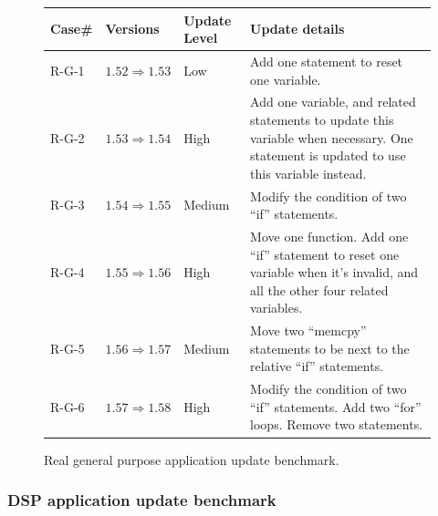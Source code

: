 \begin{figure}[htbp]
\begin{center}
\begin{small}
\begin{tabular}{||p{0.5in}|p{1in}|p{0.6in}|p{3.5in}||} \hline

Case\# & Versions & Update Level & Update details \\ \hline \hline

R-G-1 &  ${1.52 \Rightarrow 1.53}$ & Low & Add one statement to reset one variable. \\ \hline
R-G-2 &  ${1.53 \Rightarrow 1.54}$ & High & Add one variable, and related statements to
	update this variable when necessary. One statement is updated to use this variable instead. \\ \hline
R-G-3 &  ${1.54 \Rightarrow 1.55}$ & Medium & Modify the condition of two ``if'' statements. \\ \hline
R-G-4 &  ${1.55 \Rightarrow 1.56}$ & High & Move one function. Add one ``if'' statement to reset 
	one variable when it's invalid, and all the other four related variables. \\ \hline
R-G-5 &  ${1.56 \Rightarrow 1.57}$ & Medium & Move two ``memcpy'' statements to be next to the relative ``if'' statements. \\ \hline
R-G-6 &  ${1.57 \Rightarrow 1.58}$ & High & Modify the condition of two ``if'' statements. Add two ``for'' loops. Remove two statements. \\ \hline

\end{tabular}
\end{small}
\end{center}
\caption{Real general purpose application update benchmark.}
\label{fdeluge.src}
\end{figure}

\subsubsection{DSP application update benchmark}

